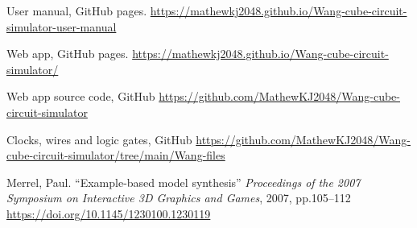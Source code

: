 \documentclass[letterpaper,11pt]{article}
\begin{document}


    
{\setlength{\baselineskip}{13pt} %
\raggedright				%
\begin{thebibliography}{99}








 User manual, GitHub pages. \url{https://mathewkj2048.github.io/Wang-cube-circuit-simulator-user-manual}

 Web app, GitHub pages. \url{https://mathewkj2048.github.io/Wang-cube-circuit-simulator/}

 Web app source code, GitHub \url{https://github.com/MathewKJ2048/Wang-cube-circuit-simulator}

 Clocks, wires and logic gates, GitHub \url{https://github.com/MathewKJ2048/Wang-cube-circuit-simulator/tree/main/Wang-files}

 Merrel, Paul. ``Example-based model synthesis'' \textit{Proceedings of the 2007 Symposium on Interactive 3D Graphics and Games}, 2007, pp.105--112 \url{https://doi.org/10.1145/1230100.1230119}


\end{thebibliography}}
\end{document}
